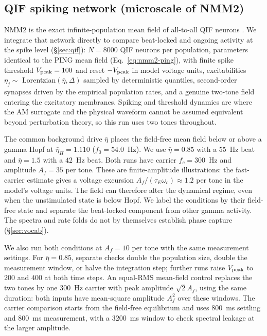 \documentclass[11pt,a4paper]{article}
\begin{document}
\subsection{QIF spiking network (microscale of NMM2)}\label{sec:qif-methods}
NMM2 is the exact infinite-population mean field of all-to-all QIF neurons
\cite{montbrio2015,ruffini2025rosetta,clusella2023}. We integrate that network directly
to compare beat-locked and ongoing activity at the spike level (\S\ref{sec:qif}): $N=8000$ QIF neurons per
population, parameters identical to the PING mean field (Eq.~\eqref{eq:nmm2-ping}),
with finite spike threshold $V_{\rm peak}=100$ and reset $-V_{\rm peak}$ in model
voltage units, excitabilities $\eta_j\sim$ Lorentzian$(\bar\eta,\Delta)$ sampled by deterministic
quantiles, second-order synapses driven by the empirical population rates, and a genuine
two-tone field entering the excitatory membranes. Spiking and threshold dynamics are
where the AM surrogate and the physical waveform cannot be assumed equivalent beyond
perturbation theory, so this run uses two tones throughout.

The common background drive $\bar\eta$ places the field-free mean field below or
above a gamma Hopf at $\bar\eta_H=1.110$ ($f_0=54.0$~Hz). We use
$\bar\eta=0.85$ with a $55$~Hz beat and $\bar\eta=1.5$ with a $42$~Hz beat.
Both runs have carrier $f_c=300$~Hz and amplitude $A_f=35$ per tone. These are
finite-amplitude illustrations: the fast-carrier estimate gives a voltage excursion
$A_f/(\tau_E\omega_c)\approx1.2$ per tone in the model's voltage units. The field
can therefore alter the dynamical regime, even when the unstimulated state is below
Hopf. We label the conditions by their field-free state and separate the beat-locked
component from other gamma activity. The spectra and rate folds do not by themselves
establish phase capture (\S\ref{sec:vocab}).

We also run both conditions at $A_f=10$ per tone with the same measurement
settings. For $\bar\eta=0.85$, separate checks double the population size,
double the measurement window, or halve the integration step; further runs raise
$V_{\rm peak}$ to $200$ and $400$ at both time steps. An equal-RMS
mean-field control replaces the two tones by one $300$~Hz carrier with peak
amplitude $\sqrt{2}A_f$, using the same duration: both inputs have mean-square
amplitude $A_f^2$ over these windows. The carrier comparison starts from the
field-free equilibrium and uses $800$~ms settling and $800$~ms measurement,
with a $3200$~ms window to check spectral leakage at the larger amplitude.
\end{document}

